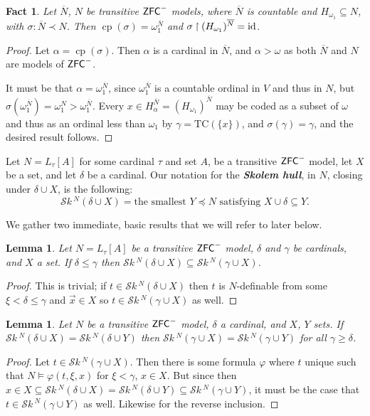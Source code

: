 \documentclass{amsart}
\newtheorem{lemma}[theorem]{Lemma}
\newtheorem{fact}[theorem]{Fact}
\theoremstyle{definition}
\theoremstyle{remark}
\newcommand{\N}{{\overline{N}}}
\newcommand{\ZFC}{\textup{\ensuremath{\textsf{ZFC}}}}
\newcommand{\id}{\textup{\ensuremath{\text{id}}}}
\DeclareMathOperator{\cp}{cp}
\newcommand{\rest}{\mathbin{\upharpoonright}}
\newcommand{\SH}{\mathcal{S}\textit{k} \,}
\newcommand{\Sk}[3]{\SH^{#1}( {#2} \cup {#3} ) }
\newcommand{\TC}[1]{\mathrm{TC}(\{ #1 \})}
\begin{document}
\begin{fact} \label{fact:CPofourEmbeddings} Let $\N$, $N$ be transitive $\ZFC^-$ models, where $\N$ is countable and $H_{\omega_1} \subseteq N$, with $\sigma: \N \prec N$. Then $\cp(\sigma)=\omega_1^{\N}$ and $\sigma \rest (H_{\omega_1})^{\N} = \id$. \end{fact}
\begin{proof}
Let $\alpha = \cp(\sigma)$. Then $\alpha$ is a cardinal in $\N$, and $\alpha > \omega$ as both $\N$ and $N$ are models of $\ZFC^-$. 

It must be that $\alpha = \omega_1^\N$, since $\omega_1^\N$ is a countable ordinal in $V$ and thus in $N$, but 
	$\sigma(\omega_1^\N)=\omega_1^N>\omega_1^{\N}.$
Every $x \in H_\alpha^\N=(H_{\omega_1})^\N$ may be coded as a subset of $\omega$ and thus as an ordinal less than $\omega_1$ by $\gamma=\TC{x}$, and $\sigma(\gamma)=\gamma$, and the desired result follows. 
\end{proof}

Let $N = L_\tau[A]$ for some cardinal $\tau$ and set $A$, be a transitive $\ZFC^-$ model, let $X$ be a set, and let $\delta$ be a cardinal. Our notation for the \textbf{\emph{Skolem hull}}, in $N$, closing under $\delta \cup X$, is the following: 
	$$\Sk{N}{\delta}{X} = \text{the smallest } Y \preccurlyeq N \text{ satisfying } X \cup \delta \subseteq Y.$$
	
We gather two immediate, basic results that we will refer to later below.

\begin{lemma} \label{lemma:subsethull}
Let $N=L_\tau[A]$ be a transitive $\ZFC^-$ model, $\delta$ and $\gamma$ be cardinals, and $X$ a set. If $\delta \leq \gamma$ then $\Sk{N}{\delta}{X} \subseteq \Sk{N}{\gamma}{X}$. 
\end{lemma}
\begin{proof}
This is trivial; if $t \in \Sk{N}{\delta}{X}$ then $t$ is $N$-definable from some $\xi < \delta \leq \gamma$ and $\vec x \in X$ so $t \in \Sk{N}{\gamma}{X}$ as well.
\end{proof}

\begin{lemma} \label{lemma:hullequality} Let $N$ be a transitive $\ZFC^-$ model, $\delta$ a cardinal, and $X$, $Y$ sets. If $\Sk{N}{\delta}{X} = \Sk{N}{\delta}{Y}$ then $\Sk{N}{\gamma}{X} = \Sk{N}{\gamma}{Y}$ for all $\gamma \geq \delta$. \end{lemma}
\begin{proof}
	Let $t \in \Sk{N}{\gamma}{X}$. Then there is some formula $\varphi$ where $t$ unique such that $N \models \varphi(t, \xi, x)$ for $\xi < \gamma$, $x \in X$. But since then $x \in X \subseteq \Sk{N}{\delta}{X}= \Sk{N}{\delta}{Y} \subseteq \Sk{N}{\gamma}{Y}$, it must be the case that $t \in \Sk{N}{\gamma}{Y}$ as well. Likewise for the reverse inclusion.
\end{proof}
\end{document}

